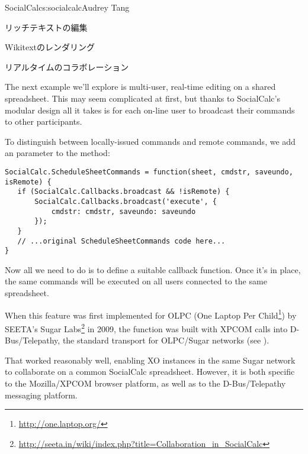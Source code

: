 \begin{aosachapter}{SocialCalc}{s:socialcalc}{Audrey Tang}
\begin{aosasect1}{リッチテキストの編集}
\begin{aosasect2}{Wikitextのレンダリング}

\end{aosasect2}

\end{aosasect1}


\begin{aosasect1}{リアルタイムのコラボレーション}

The next example we'll explore is multi-user, real-time editing on a
shared spreadsheet.  This may seem complicated at first, but thanks to
SocialCalc's modular design all it takes is for each on-line user to
broadcast their commands to other participants.

To distinguish between locally-issued commands and remote commands, we
add an  parameter to the 
method:

\begin{verbatim}
SocialCalc.ScheduleSheetCommands = function(sheet, cmdstr, saveundo, isRemote) {
   if (SocialCalc.Callbacks.broadcast && !isRemote) {
       SocialCalc.Callbacks.broadcast('execute', {
           cmdstr: cmdstr, saveundo: saveundo
       });
   }
   // ...original ScheduleSheetCommands code here...
}
\end{verbatim}

\noindent Now all we need to do is to define a suitable
 callback function.  Once it's
in place, the same commands will be executed on all users connected
to the same spreadsheet.

When this feature was first implemented for OLPC (One Laptop Per 
Child\footnote{\url{http://one.laptop.org/}}) by SEETA's Sugar 
Labs\footnote{\url{http://seeta.in/wiki/index.php?title=Collaboration_in_SocialCalc}}
in 2009, the  function was built with XPCOM calls into
D-Bus/Telepathy, the standard transport for OLPC/Sugar networks (see
).


That worked reasonably well, enabling XO instances in the same Sugar
network to collaborate on a common SocialCalc spreadsheet.  However,
it is both specific to the Mozilla/XPCOM browser platform, as well as
to the D-Bus/Telepathy messaging platform.


\end{aosasect1}
\end{aosachapter}
